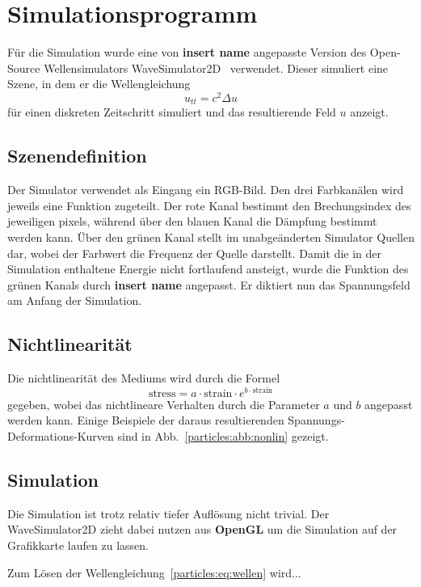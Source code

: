 %
%
%
%
\section{Simulationsprogramm\label{particles:section:simulation}}

Für die Simulation wurde eine von \textbf{insert name} angepasste Version des Open-Source Wellensimulators WaveSimulator2D~\cite{repo:wavesim2d} verwendet. %
Dieser simuliert eine Szene, in dem er die Wellengleichung
\[
    u_{tt} = c^2 \Delta u \label{particles:eq:wellen}
\] 
für einen diskreten Zeitschritt simuliert und das resultierende Feld $u$ anzeigt.

\subsection{Szenendefinition}
Der Simulator verwendet als Eingang ein RGB-Bild.
Den drei Farbkanälen wird jeweils eine Funktion zugeteilt.
Der rote Kanal bestimmt den Brechungsindex des jeweiligen pixels, während über den blauen Kanal die Dämpfung bestimmt werden kann.
Über den grünen Kanal stellt im unabgeänderten Simulator Quellen dar, wobei der Farbwert die Frequenz der Quelle darstellt.
Damit die in der Simulation enthaltene Energie nicht fortlaufend ansteigt, wurde die Funktion des grünen Kanals durch \textbf{insert name} angepasst. %
Er diktiert nun das Spannungsfeld am Anfang der Simulation. %

\subsection{Nichtlinearität}
Die nichtlinearität des Mediums wird durch die Formel
\[
    \text{stress} = a \cdot \text{strain} \cdot e^{b \cdot \text{strain}} %
\]
gegeben, wobei das nichtlineare Verhalten durch die Parameter $a$ und $b$ angepasst werden kann.
Einige Beispiele der daraus resultierenden Spannungs-Deformations-Kurven sind in Abb.~\ref{particles:abb:nonlin} gezeigt. %

\subsection{Simulation}
Die Simulation ist trotz relativ tiefer Auflösung nicht trivial. 
Der WaveSimulator2D zieht dabei nutzen aus \textbf{OpenGL} um die Simulation auf der Grafikkarte laufen zu lassen. %

Zum Lösen der Wellengleichung~\ref{particles:eq:wellen} wird... %